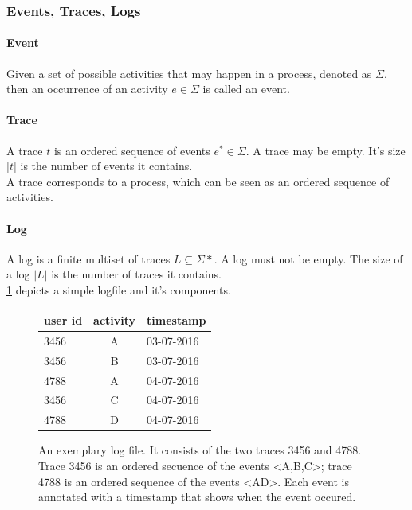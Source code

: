 \documentclass[
	a4paper,
	pagesize,
	pdftex,
	12pt,
	twoside, %
	BCOR=5mm, %
	ngerman,
	fleqn,
	final,
	]{scrartcl}
\begin{document}
\subsubsection{Events, Traces, Logs}
\paragraph{Event}
Given a set of possible activities that may happen in a process, denoted as $\Sigma$,
then an occurrence of an activity $e \in \Sigma$ is called an event.
\paragraph{Trace}
A trace $t$ is an ordered sequence of events $e^* \in \Sigma$.
A trace may be empty.
It's size $|t|$ is the number of events it contains.\\
A trace corresponds to a process, which can be seen as an ordered sequence of activities.
\paragraph{Log}
A log is a finite multiset of traces $L\subseteq \Sigma*$.
A log must not be empty. The size of a log $|L|$ is the number of traces it contains.\\
\ref{fig:logfile} depicts a simple logfile and it's components.\\
\begin{figure}[h]
\centering
\begin{tabular}{l|c|l}
 user id & activity & timestamp\\
 \hline
 3456 & A & 03-07-2016\\
 3456 & B & 03-07-2016\\
 4788 & A & 04-07-2016\\
 3456 & C & 04-07-2016\\
 4788 & D & 04-07-2016\\
 \end{tabular}
 \caption{An exemplary log file. It consists of the two traces 3456 and 4788. Trace 3456 is an ordered secuence of the events <A,B,C>; trace 4788 is an ordered sequence of the events <AD>. Each event is annotated with a timestamp that shows when the event occured.}
 \label{fig:logfile}
\end{figure}
\end{document}
